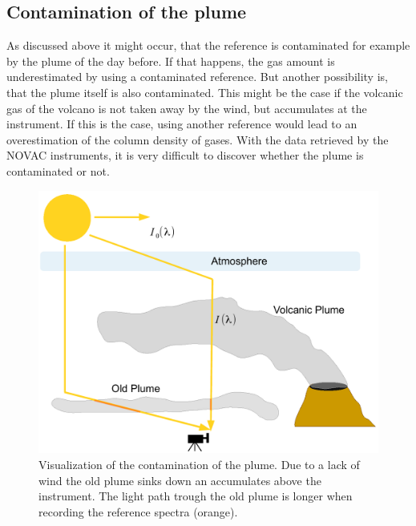 \subsection{Contamination of the plume}
As discussed above it might occur, that the reference is contaminated for example by the plume of the day before.
If that happens, the gas amount is underestimated by using a contaminated reference. But another possibility is, that the plume itself is also contaminated. This might be the case if the volcanic gas of the volcano is not taken away by the wind, but accumulates at the instrument. If this is the case, using another reference would lead to an overestimation of the column density of gases. With the data retrieved by the NOVAC instruments, it is very difficult to discover whether the plume is contaminated or not. \\
%
%
\begin{figure}
	\centering
	\includegraphics[width=0.7\linewidth]{Bilder/Contaminationplume}
	\caption{Visualization of the contamination of the plume. Due to a lack of wind the old plume sinks down an accumulates
		above the instrument. The light path trough the old plume is longer when recording the reference spectra (orange).}
	\label{fig:contaminationplume}
\end{figure}
